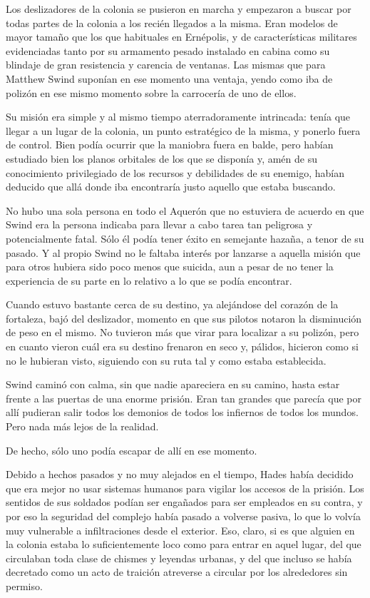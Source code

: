 \parbreak
Los deslizadores de la colonia se pusieron en marcha y empezaron a buscar por todas partes de la colonia a los recién llegados a la misma. Eran modelos de mayor tamaño que los que habituales en Ernépolis, y de características militares evidenciadas tanto por su armamento pesado instalado en cabina como su blindaje de gran resistencia y carencia de ventanas. Las mismas que para Matthew Swind suponían en ese momento una ventaja, yendo como iba de polizón en ese mismo momento sobre la carrocería de uno de ellos.

Su misión era simple y al mismo tiempo aterradoramente intrincada: tenía que llegar a un lugar de la colonia, un punto estratégico de la misma, y ponerlo fuera de control. Bien podía ocurrir que la maniobra fuera en balde, pero habían estudiado bien los planos orbitales de los que se disponía y, amén de su conocimiento privilegiado de los recursos y debilidades de su enemigo, habían deducido que allá donde iba encontraría justo aquello que estaba buscando.

No hubo una sola persona en todo el Aquerón que no estuviera de acuerdo en que Swind era la persona indicaba para llevar a cabo tarea tan peligrosa y potencialmente fatal. Sólo él podía tener éxito en semejante hazaña, a tenor de su pasado. Y al propio Swind no le faltaba interés por lanzarse a aquella misión que para otros hubiera sido poco menos que suicida, aun a pesar de no tener la experiencia de su parte en lo relativo a lo que se podía encontrar.

Cuando estuvo bastante cerca de su destino, ya alejándose del corazón de la fortaleza, bajó del deslizador, momento en que sus pilotos notaron la disminución de peso en el mismo. No tuvieron más que virar para localizar a su polizón, pero en cuanto vieron cuál era su destino frenaron en seco y, pálidos, hicieron como si no le hubieran visto, siguiendo con su ruta tal y como estaba establecida.

Swind caminó con calma, sin que nadie apareciera en su camino, hasta estar frente a las puertas de una enorme prisión. Eran tan grandes que parecía que por allí pudieran salir todos los demonios de todos los infiernos de todos los mundos. Pero nada más lejos de la realidad.

De hecho, sólo uno podía escapar de allí en ese momento.

Debido a hechos pasados y no muy alejados en el tiempo, Hades había decidido que era mejor no usar sistemas humanos para vigilar los accesos de la prisión. Los sentidos de sus soldados podían ser engañados para ser empleados en su contra, y por eso la seguridad del complejo había pasado a volverse pasiva, lo que lo volvía muy vulnerable a infiltraciones desde el exterior. Eso, claro, si es que alguien en la colonia estaba lo suficientemente loco como para entrar en aquel lugar, del que circulaban toda clase de chismes y leyendas urbanas, y del que incluso se había decretado como un acto de traición atreverse a circular por los alrededores sin permiso.

